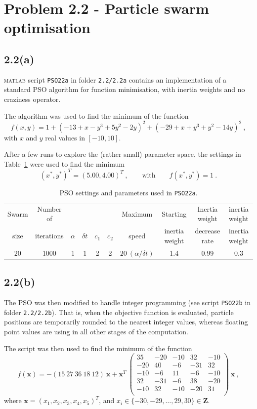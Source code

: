 \documentclass[12pt,titlepage]{article}
\begin{document}
\section*{Problem 2.2 - Particle swarm optimisation}

\subsection*{2.2(a)}
\textsc{matlab} script \texttt{PSO22a} in folder \texttt{2.2/2.2a} contains an implementation of a standard PSO algorithm for function minimisation, with inertia weights and no craziness operator.

The algorithm was used to find the minimum of the function
\[
f(x, y) = 1 + (−13 + x − y^3 + 5y^2 − 2y)^2 + (−29 + x + y^3 	+ y^2 − 14y)^2 \ ,
\]
with $x$ and $y$ real values in $[-10, 10]$. 

After a few runs to explore the (rather small) parameter space, the settings in Table~\ref{tab:2a} were used to find the minimum
\[
(x^*,y^*)^T = (5.00, 4.00)^T \ , \qquad \mbox{with} \qquad f(x^*,y^*) = 1 \ .
\]

\begin{table}[hbtp]
\centering
\begin{tabular}{cccccccccc}
\toprule
Swarm & Number of &  &  &  &  & Maximum & Starting & Inertia weight & inertia weight \\
size & iterations & $ \alpha$ & $ \delta t$ & $ c_1$ & $ c_2$ & speed & inertia weight & decrease rate & inertia weight \\
\midrule
20 & 1000 & 1 & 1 & 2 & 2 & $ 20 \ (\alpha / \delta t) $ & 1.4 & 0.99 & 0.3 \\
\bottomrule
\end{tabular}
\caption{PSO settings and parameters used in \texttt{PSO22a}.}
\label{tab:2a}
\end{table}

\subsection*{2.2(b)}
The PSO was then modified to handle integer programming (see script \texttt{PSO22b} in folder \texttt{2.2/2.2b}). That is, when the objective function is evaluated, particle positions are temporarily rounded to the nearest integer values, whereas floating point values are using in all other stages of the computation.

The script was then used to find the minimum of the function
\[
f(\bm{x}) = -(15 \ 27 \ 36 \ 18 \ 12) \ \bm{x} + \bm{x}^T \ \begin{pmatrix}
35 & -20 & -10 & 32 & -10 \\
-20 &  40 & -6 & -31 & 32 \\
-10 & -6 & 11 & -6 & -10 \\
32 & -31 & -6 & 38 & -20 \\
-10 & 32 & -10 & -20 & 31 \\
\end{pmatrix} \ \bm{x} \ ,
\]
where $ \bm{x} = (x_1 , x_2 , x_3 , x_4 , x_5 )^T$, and $x_i \in \lbrace −30, −29, \ldots , 29, 30 \rbrace \in \mathbf{Z}$.
\end{document}
